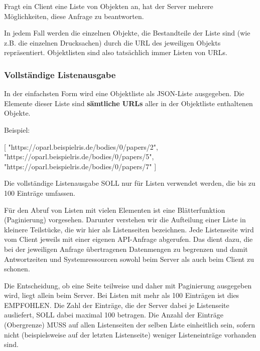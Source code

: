 \documentclass[,a4paper]{article}
\newenvironment{Shaded}{}{}
\newcommand{\StringTok}[1]{\textcolor[rgb]{0.25,0.44,0.63}{{#1}}}
\newcommand{\OtherTok}[1]{\textcolor[rgb]{0.00,0.44,0.13}{{#1}}}
\begin{document}
Fragt ein Client eine Liste von Objekten an, hat der Server mehrere
Möglichkeiten, diese Anfrage zu beantworten.

In jedem Fall werden die einzelnen Objekte, die Bestandteile der Liste
sind (wie z.B. die einzelnen Drucksachen) durch die URL des jeweiligen
Objekts repräsentiert. Objektlisten sind also tatsächlich immer Listen
von URLs.

\subsubsection{Vollständige
Listenausgabe}\label{vollstuxe4ndige-listenausgabe}

In der einfachsten Form wird eine Objektliste als JSON-Liste ausgegeben.
Die Elemente dieser Liste sind \textbf{sämtliche URLs} aller in der
Objektliste enthaltenen Objekte.

Beispiel:

\begin{Shaded}
\begin{Highlighting}[]
\OtherTok{[}
    \StringTok{"https://oparl.beispielris.de/bodies/0/papers/2"}\OtherTok{,}
    \StringTok{"https://oparl.beispielris.de/bodies/0/papers/5"}\OtherTok{,}
    \StringTok{"https://oparl.beispielris.de/bodies/0/papers/7"}
\OtherTok{]}
\end{Highlighting}
\end{Shaded}

Die vollständige Listenausgabe SOLL nur für Listen verwendet werden, die
bis zu 100 Einträge umfassen.


Für den Abruf von Listen mit vielen Elementen ist eine Blätterfunktion
(Paginierung) vorgesehen. Darunter verstehen wir die Aufteilung einer
Liste in kleinere Teilstücke, die wir hier als Listenseiten bezeichnen.
Jede Listenseite wird vom Client jeweils mit einer eigenen API-Anfrage
abgerufen. Das dient dazu, die bei der jeweiligen Anfrage übertragenen
Datenmengen zu begrenzen und damit Antwortzeiten und Systemressourcen
sowohl beim Server als auch beim Client zu schonen.

Die Entscheidung, ob eine Seite teilweise und daher mit Paginierung
ausgegeben wird, liegt allein beim Server. Bei Listen mit mehr als 100
Einträgen ist dies EMPFOHLEN. Die Zahl der Einträge, die der Server
dabei je Listenseite ausliefert, SOLL dabei maximal 100 betragen. Die
Anzahl der Einträge (Obergrenze) MUSS auf allen Listenseiten der selben
Liste einheitlich sein, sofern nicht (beispielsweise auf der letzten
Listenseite) weniger Listeneinträge vorhanden sind.
\end{document}

